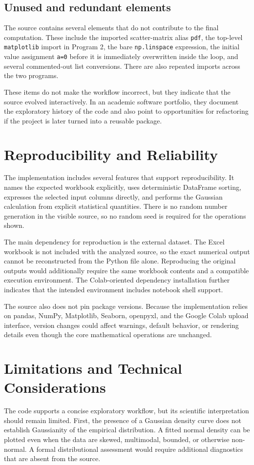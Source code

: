 \documentclass[11pt,a4paper]{article}
\begin{document}
\subsection{Unused and redundant elements}
The source contains several elements that do not contribute to the final computation. These include the imported scatter-matrix alias \texttt{pdf}, the top-level \texttt{matplotlib} import in Program 2, the bare \texttt{np.linspace} expression, the initial value assignment \texttt{a=0} before it is immediately overwritten inside the loop, and several commented-out list conversions. There are also repeated imports across the two programs.

These items do not make the workflow incorrect, but they indicate that the source evolved interactively. In an academic software portfolio, they document the exploratory history of the code and also point to opportunities for refactoring if the project is later turned into a reusable package.

\section{Reproducibility and Reliability}
The implementation includes several features that support reproducibility. It names the expected workbook explicitly, uses deterministic DataFrame sorting, expresses the selected input columns directly, and performs the Gaussian calculation from explicit statistical quantities. There is no random number generation in the visible source, so no random seed is required for the operations shown.

The main dependency for reproduction is the external dataset. The Excel workbook is not included with the analyzed source, so the exact numerical output cannot be reconstructed from the Python file alone. Reproducing the original outputs would additionally require the same workbook contents and a compatible execution environment. The Colab-oriented dependency installation further indicates that the intended environment includes notebook shell support.

The source also does not pin package versions. Because the implementation relies on pandas, NumPy, Matplotlib, Seaborn, openpyxl, and the Google Colab upload interface, version changes could affect warnings, default behavior, or rendering details even though the core mathematical operations are unchanged.

\section{Limitations and Technical Considerations}
The code supports a concise exploratory workflow, but its scientific interpretation should remain limited. First, the presence of a Gaussian density curve does not establish Gaussianity of the empirical distribution. A fitted normal density can be plotted even when the data are skewed, multimodal, bounded, or otherwise non-normal. A formal distributional assessment would require additional diagnostics that are absent from the source.
\end{document}
